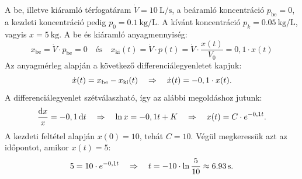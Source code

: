 \documentclass{szb-solution}
\begin{document}
A be, illetve kiáramló térfogatáram $\dot V = \SI{10}{\liter\per\second}$, a
beáramló koncentráció $p_\text{be} = 0$, a kezdeti koncentráció pedig
$p_0 = \SI{0.1}{\kilogram\per\liter}$. A kívánt koncentráció
$p_k = \SI{0.05}{\kilogram\per\liter}$, vagyis $x = \SI{5}{\kilogram}$.
A be és kiáramló anyagmennyiség:
$$
  x_\text{be} = \dot{V} \cdot p_\text{be} = 0
  \quad \text{és} \quad
  x_\text{ki}(t)
  = \dot{V} \cdot p(t)
  = \dot{V} \cdot \frac{x(t)}{V_0}
  = 0,1 \cdot x(t)
$$
Az anyagmérleg alapján a következő differenciálegyenletet kapjuk:
$$
  \dot{x}(t) = x_\text{be} - x_\text{ki}(t)
  \quad \Rightarrow \quad
  \dot{x}(t) = -0,1 \cdot x(t)
  \text.
$$
A differenciálegyenlet szétválaszható, így az alábbi megoldáshoz jutunk:
$$
  \frac{\mathop{}\!\mathrm{d} x}{x} = -0,1 \mathop{}\!\mathrm{d} t
  \quad \Rightarrow \quad
  \ln x = -0,1 t + K
  \quad \Rightarrow \quad
  x(t) = C \cdot e^{-0,1 t}
  \text.
$$
A kezdeti feltétel alapján $x(0) = 10$, tehát $C = 10$. Végül megkeressük azt az
időpontot, amikor $x(t) = 5$:
$$
  5 = 10 \cdot e^{-0,1 t}
  \quad \Rightarrow \quad
  t = -10 \cdot \ln \frac{5}{10} \approx \SI{6.93}{\second}
  \text.
$$
\end{document}
